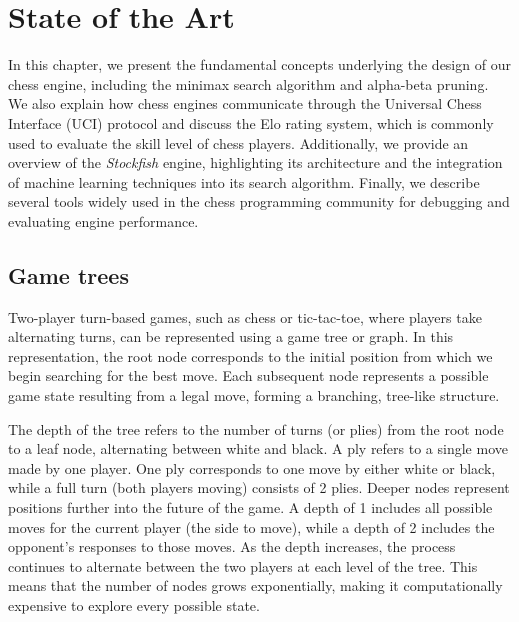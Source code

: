 \chapter{State of the Art}\label{cap:estadoDeLaCuestion}

In this chapter, we present the fundamental concepts underlying the design of our chess engine, including the minimax search algorithm and alpha-beta pruning. We also explain how chess engines communicate through the Universal Chess Interface (UCI) protocol and discuss the Elo rating system, which is commonly used to evaluate the skill level of chess players. Additionally, we provide an overview of the \textit{Stockfish} engine, highlighting its architecture and the integration of machine learning techniques into its search algorithm. Finally, we describe several tools widely used in the chess programming community for debugging and evaluating engine performance.


\section{Game trees}

\par Two-player turn-based games, such as chess or tic-tac-toe, where players take alternating turns, can be represented using a game tree or graph. In this representation, the root node corresponds to the initial position from which we begin searching for the best move. Each subsequent node represents a possible game state resulting from a legal move, forming a branching, tree-like structure.

\vspace{1em}

\par The depth of the tree refers to the number of turns (or plies) from the root node to a leaf node, alternating between white and black. A ply refers to a single move made by one player. One ply corresponds to one move by either white or black, while a full turn (both players moving) consists of 2 plies. Deeper nodes represent positions further into the future of the game. A depth of 1 includes all possible moves for the current player (the side to move), while a depth of 2 includes the opponent's responses to those moves. As the depth increases, the process continues to alternate between the two players at each level of the tree. This means that the number of nodes grows exponentially, making it computationally expensive to explore every possible state.

